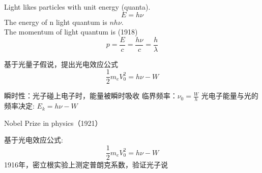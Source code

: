 \begin{frame}
    \frametitle{}
        \begin{figure}
            \centering
        \end{figure}
\end{frame}

\begin{frame} 
    \begin{tcolorbox4}
        \bullet Light likes particles with unit energy  (quanta).\\
        \[E=h\nu\]  
        \bullet The energy of n light quantum is $nh\nu$. \\
        \bullet The momentum of light quantum is (1918) \\
        \[p=\frac{E}{c}=\frac{h\nu}{c}=\frac{h}{\lambda}\]
    \end{tcolorbox4}
\end{frame}

\begin{frame} 
    基于光量子假说，提出光电效应公式
    \[
    \frac{1}{2}m_eV_0^2=h\nu-W
    \]
    \begin{itemize}
        \Item  瞬时性：光子碰上电子时，能量被瞬时吸收
        \Item  临界频率：$\nu_0=\frac{W}{h} $
        \Item  光电子能量与光的频率决定: $E_k=h\nu-W$
    \end{itemize}
    {\color{deepred} Nobel Prize in physics（1921）}
\end{frame}

\begin{frame} 
    基于光电效应公式:
$$
\frac{1}{2}m_eV_0^2=h\nu-W
$$
1916年，密立根实验上测定普朗克系数，验证光子说\\
\color{deepred}{1923年诺贝尔物理学奖} 
\end{frame}

